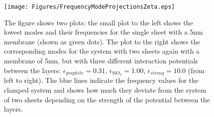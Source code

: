 \begin{figure}[H]
    \centering
    \texttt{[image: Figures/FrequencyModeProjectionsZeta.eps]}
    \caption{The figure shows two plots: the small plot to the left shows the lowest modes and their frequencies for the single sheet with a 5nm membrane (shown as green dots).  The plot to the right shows the corresponding modes for the system with two sheets again with a membrane of 5nm, but with three different interaction potentials between the layers: $\epsilon_{graphite}=0.31$, $\epsilon_{\text{SiO}_{2}}=1.00$, $\epsilon_{strong}=10.0$ (from left to right). The blue lines indicate the frequency values for the clamped system and shows how much they deviate from the system of two sheets depending on the strength of the potential between the layers.} 
    \label{interpot}
\end{figure}
\twocolumngrid

